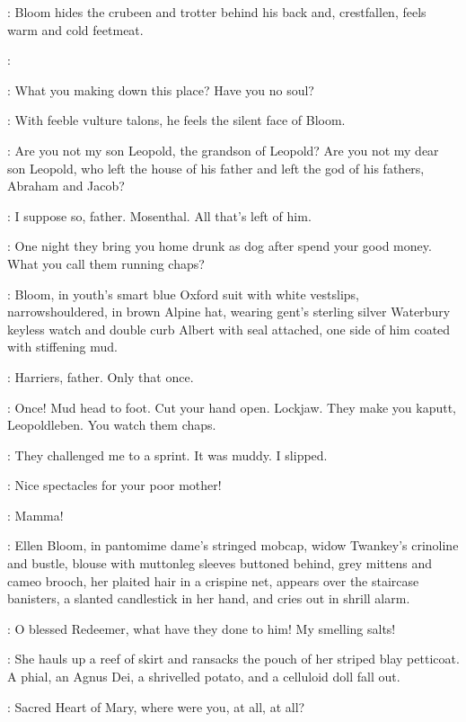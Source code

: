 :
Bloom hides the crubeen and trotter behind his back and,
crestfallen,
feels warm and cold feetmeat.

\Bloom:

\Rudolph:
What you making down this place?
Have you no soul?

:
With feeble vulture talons,
he feels the silent face of Bloom.

\Rudolph:
Are you not my son Leopold,
the grandson of Leopold?
Are you not my dear son Leopold,
who left the house of his father
and left the god of his fathers,
Abraham and Jacob?

\Bloom:
I suppose so,
father.
Mosenthal.
All that's left of him.

\Rudolph:
One night they bring you home drunk as dog after spend your good money.
What you call them running chaps?

:
Bloom,
in youth's smart blue Oxford suit with white vestslips,
narrowshouldered,
in brown Alpine hat,
wearing gent's sterling silver Waterbury keyless watch
and double curb Albert with seal attached,
one side of him coated with stiffening mud.

\Bloom:
Harriers,
father.
Only that once.

\Rudolph:
Once!
Mud head to foot.
Cut your hand open.
Lockjaw.
They make you kaputt,
Leopoldleben.
You watch them chaps.

\Bloom:
They challenged me to a sprint.
It was muddy.
I slipped.

\Rudolph:
Nice spectacles for your poor mother!

\Bloom:
Mamma!

:
Ellen Bloom,
in pantomime dame's stringed mobcap,
widow Twankey's crinoline and bustle,
blouse with muttonleg sleeves buttoned behind,
grey mittens and cameo brooch,
her plaited hair in a crispine net,
appears over the staircase banisters,
a slanted candlestick in her hand,
and cries out in shrill alarm.

\Ellen:
O blessed Redeemer,
what have they done to him!
My smelling salts!

:
She hauls up a reef of skirt and ransacks the
pouch of her striped blay petticoat.
A phial,
an Agnus Dei,
a shrivelled potato,
and a celluloid doll fall out.

\Ellen:
Sacred Heart of Mary,
where were you,
at all,
at all?

